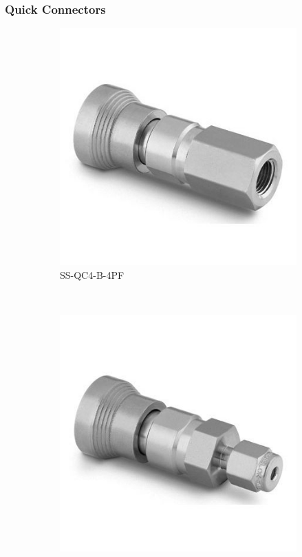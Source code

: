 \subsubsection{Quick Connectors}
\begin{figure}[H]
    \centering
    \begin{subfigure}[b]{0.21\textwidth}
    \centering
    \includegraphics[width=\textwidth]{appendix/img/interfaces/SS-QC4-B-4PF.jpg}
    \caption{SS-QC4-B-4PF}
    \end{subfigure}
    ~
    \begin{subfigure}[b]{0.21\textwidth}
    \centering
    \includegraphics[width=\textwidth]{appendix/img/interfaces/SS-QC4-B-200.jpg}

\end{subfigure}
\end{figure}
